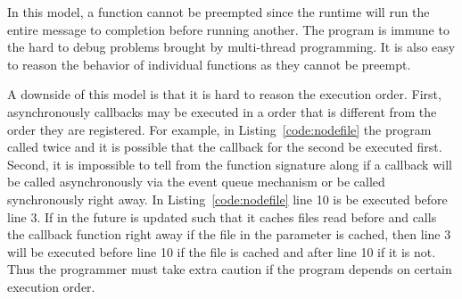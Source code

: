 
In this model, a function cannot be preempted since the runtime will
run the entire message to completion before running another.
The program is immune to the hard to debug problems brought by multi-thread
programming.
It is also easy to reason the behavior of individual functions as they cannot
be preempt.

A downside of this model is that it is hard to reason the execution order.
First, asynchronously callbacks may be executed in a order that is different 
from the order they are registered.
For example, in Listing~\ref{code:nodefile} the program called 
twice and it is possible that the callback for the second  be
executed first.
Second, it is impossible to tell from the function signature along if a 
callback will be called asynchronously via the event queue mechanism or be
called synchronously right away. In Listing~\ref{code:nodefile} line 10 is
be executed before line 3. If in the future  is updated such
that it caches files read before and calls the callback function right away
if the file in the parameter is cached, then line 3 will be executed before
line 10 if the file is cached and after line 10 if it is not.
Thus the programmer must take extra caution if the program depends on certain
execution order.



